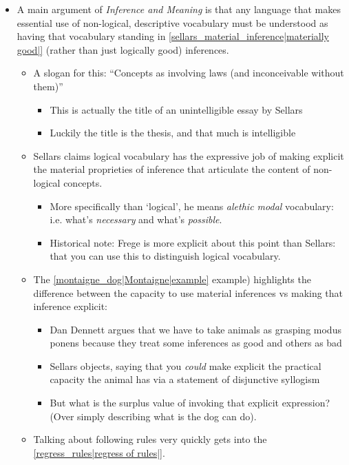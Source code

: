 \begin{itemize}
\item A main argument of \textit{Inference and Meaning} is that any language that makes essential use of non-logical, descriptive vocabulary must be understood as having that vocabulary standing in \ref{sellars_material_inference|materially good|} (rather than just logically good) inferences.
    \begin{itemize}
    \item A slogan for this: ``Concepts as involving laws (and inconceivable without them)''
        \begin{itemize}
        \item This is actually the title of an unintelligible essay by Sellars
        \item Luckily the title is the thesis, and that much is intelligible
        \end{itemize}
    \item Sellars claims logical vocabulary has the expressive job of making explicit the material proprieties of inference that articulate the content of non-logical concepts.
    \begin{itemize}
    \item More specifically than `logical', he means \emph{alethic modal} vocabulary: i.e. what's \emph{necessary} and what's \emph{possible}.
    \item Historical note: Frege is more explicit about this point than Sellars: that you can use this to distinguish logical vocabulary.
    \end{itemize}
    \item The \ref{montaigne_dog|Montaigne|example} example) highlights the difference between the capacity to use material inferences vs making that inference explicit:
        \begin{itemize}
        \item Dan Dennett argues that we have to take animals as grasping modus ponens because they treat some inferences as good and others as bad
        \item Sellars objects, saying that you \emph{could} make explicit the practical capacity the animal has via a statement of disjunctive syllogism
        \item But what is the surplus value of invoking that explicit expression? (Over simply describing what is the dog can do).
        \end{itemize}
    \item Talking about following rules very quickly gets into the \ref{regress_rules|regress of rules|}.

\end{itemize}
\end{itemize}
